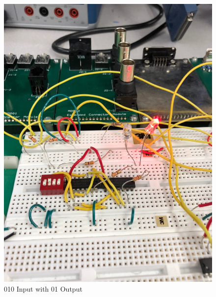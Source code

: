 \documentclass[10pt]{article}
\begin{document}
\begin{centering}
	\begin{figure} [H]
		\centering
		\includegraphics[scale=0.07]{images/010led.jpg}
		\caption{010 Input with 01 Output}
	\end{figure}
\end{centering}
\end{document}
